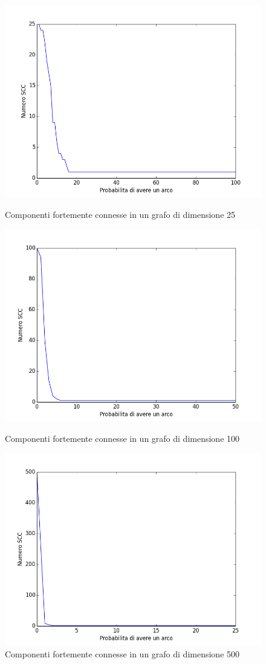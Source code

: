 \documentclass[11pt]{article}
\begin{document}
\begin{figure}[p]
\includegraphics[scale=0.33,angle=0]{scc25.png}
\centering
\caption{Componenti fortemente connesse in un grafo di dimensione 25}
\label{scc25}
\includegraphics[scale=0.33,angle=0]{scc100.png}
\centering
\caption{Componenti fortemente connesse in un grafo di dimensione 100}
\label{scc100}
\includegraphics[scale=0.33,angle=0]{scc500.png}
\centering
\caption{Componenti fortemente connesse in un grafo di dimensione 500}
\label{scc500}
\end{figure}
\end{document}
